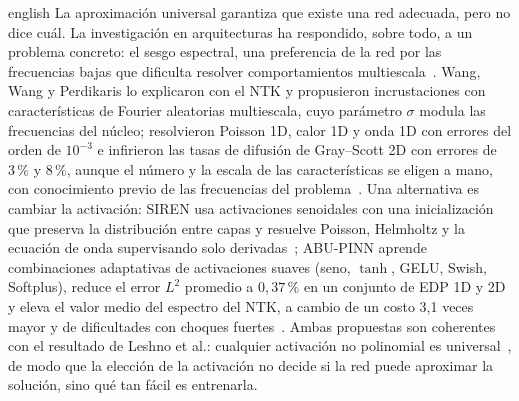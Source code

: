 \documentclass[0000.tex]{subfiles}
\begin{document}
\begin{hyphenrules}{english}
La aproximación universal garantiza que existe una red adecuada, pero no dice cuál. La investigación en arquitecturas ha respondido, sobre todo, a un problema concreto: el sesgo espectral, una preferencia de la red por las frecuencias bajas que dificulta resolver comportamientos multiescala~\cite{cuomo2022scientific}. Wang, Wang y Perdikaris lo explicaron con el NTK y propusieron incrustaciones con características de Fourier aleatorias multiescala, cuyo parámetro $\sigma$ modula las frecuencias del núcleo; resolvieron Poisson 1D, calor 1D y onda 1D con errores del orden de $10^{-3}$ e infirieron las tasas de difusión de Gray--Scott 2D con errores de $3\,\%$ y $8\,\%$, aunque el número y la escala de las características se eligen a mano, con conocimiento previo de las frecuencias del problema~\cite{wang2021eigenvector}. Una alternativa es cambiar la activación: SIREN usa activaciones senoidales con una inicialización que preserva la distribución entre capas y resuelve Poisson, Helmholtz y la ecuación de onda supervisando solo derivadas~\cite{sitzmann2020implicit}; ABU-PINN aprende combinaciones adaptativas de activaciones suaves (seno, $\tanh$, GELU, Swish, Softplus), reduce el error $L^2$ promedio a $0{,}37\,\%$ en un conjunto de EDP 1D y 2D y eleva el valor medio del espectro del NTK, a cambio de un costo 3,1 veces mayor y de dificultades con choques fuertes~\cite{wang2023learning}. Ambas propuestas son coherentes con el resultado de Leshno et al.: cualquier activación no polinomial es universal~\cite{leshno1993multilayer}, de modo que la elección de la activación no decide si la red puede aproximar la solución, sino qué tan fácil es entrenarla.


\end{hyphenrules}
\end{document}
